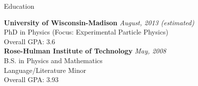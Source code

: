 \documentclass{resume} %
\begin{document}






\begin{rSection}{Education}

{\bf University of Wisconsin-Madison} \hfill {\em August, 2013 (estimated)} \\ 
\/PhD in Physics (Focus: Experimental Particle Physics) \\
Overall GPA: 3.6 \\

{\bf Rose-Hulman Institute of Technology} \hfill {\em May, 2008} \\
B.S. in Physics and Mathematics\\
Language/Literature Minor\\
Overall GPA: 3.93 \\
\end{rSection}

\end{document}
